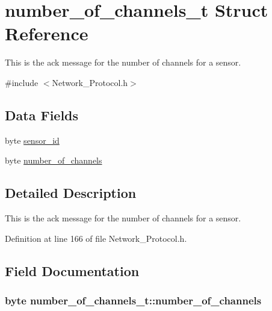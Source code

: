 \hypertarget{structnumber__of__channels__t}{\section{number\-\_\-of\-\_\-channels\-\_\-t Struct Reference}
\label{structnumber__of__channels__t}
}


This is the ack message for the number of channels for a sensor.  




{\ttfamily \#include $<$Network\-\_\-\-Protocol.\-h$>$}

\subsection*{Data Fields}
\begin{DoxyCompactItemize}
\item 
byte \hyperlink{structnumber__of__channels__t_a1bcf45943ede04abfe8eb0d8900a1f48}{sensor\-\_\-id}
\item 
byte \hyperlink{structnumber__of__channels__t_abea58ee643a6d6ae7493f43ec0dc43e8}{number\-\_\-of\-\_\-channels}
\end{DoxyCompactItemize}


\subsection{Detailed Description}
This is the ack message for the number of channels for a sensor. 

Definition at line 166 of file Network\-\_\-\-Protocol.\-h.



\subsection{Field Documentation}
\hypertarget{structnumber__of__channels__t_abea58ee643a6d6ae7493f43ec0dc43e8}{
\subsubsection[{number\-\_\-of\-\_\-channels}]{\setlength{\rightskip}{0pt plus 5cm}byte number\-\_\-of\-\_\-channels\-\_\-t\-::number\-\_\-of\-\_\-channels}}\label{structnumber__of__channels__t_abea58ee643a6d6ae7493f43ec0dc43e8}


